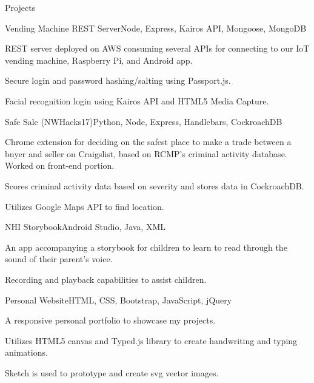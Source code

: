 \documentclass{resume} %
\begin{document}
\begin{rSection}{Projects}
\begin{multicols}{2}
\begin{rSubsection}{Vending Machine REST Server}{}{Node, Express, Kairos API, Mongoose, MongoDB}{}
  \item REST server deployed on AWS consuming several APIs for connecting to our IoT vending machine, Raspberry Pi, and Android app.
  \item Secure login and password hashing/salting using Passport.js.
  \item Facial recognition login using Kairos API and HTML5 Media Capture.
\end{rSubsection}
\columnbreak %
  \begin{rSubsection}{Safe Sale (NWHacks17)}{}{Python, Node, Express, Handlebars, CockroachDB}{}
  \item Chrome extension for deciding on the safest place to make a trade between a buyer and seller on Craigslist, based on RCMP's criminal activity database. Worked on front-end portion.
  \item Scores criminal activity data based on severity and stores data in CockroachDB.
  \item Utilizes Google Maps API to find location.
\end{rSubsection}
\end{multicols}


\begin{multicols}{2}
\begin{rSubsection}{NHI Storybook}{}{Android Studio, Java, XML}{}
  \item An app accompanying a storybook for children to learn to read through the sound of their parent's voice.
  \item Recording and playback capabilities to assist children.
\end{rSubsection}
\columnbreak %
  \begin{rSubsection}{Personal Website}{}{HTML, CSS, Bootstrap, JavaScript, jQuery}{}
  \item A responsive personal portfolio to showcase my projects.
  \item Utilizes HTML5 canvas and Typed.js library to create handwriting and typing animations.
  \item Sketch is used to prototype and create svg vector images.
\end{rSubsection}
\end{multicols}

\end{rSection}
\end{document}
